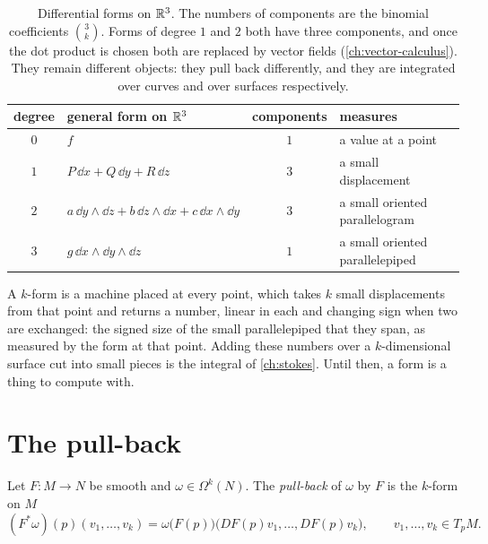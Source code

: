 \begin{notechapter}
\begin{table}[ht]
\centering
\begin{tabular}{@{}clcl@{}}
\toprule
degree & general form on $\mathbb{R}^3$ & components & measures \\
\midrule
$0$ & $f$ & $1$ & a value at a point \\
$1$ & $P\,\dd x + Q\,\dd y + R\,\dd z$ & $3$
  & a small displacement \\
$2$ & $a\,\dd y\wedge\dd z + b\,\dd z\wedge\dd x + c\,\dd x\wedge\dd y$
  & $3$ & a small oriented parallelogram \\
$3$ & $g\,\dd x\wedge\dd y\wedge\dd z$ & $1$
  & a small oriented parallelepiped \\
\bottomrule
\end{tabular}
\caption{Differential forms on $\mathbb{R}^3$. The numbers of components are the
binomial coefficients $\binom3k$. Forms of degree $1$ and $2$ both have
three components, and once the dot product is chosen both are replaced
by vector fields (\cref{ch:vector-calculus}). They remain different
objects: they pull back differently, and they are integrated over
curves and over surfaces respectively.}
\label{differential-forms:tab:degrees}
\end{table}

\begin{intuition}
A $k$-form is a machine placed at every point, which takes $k$ small
displacements from that point and returns a number, linear in each and
changing sign when two are exchanged: the signed size of the small
parallelepiped that they span, as measured by the form at that point.
Adding these numbers over a $k$-dimensional surface cut into small
pieces is the integral of \cref{ch:stokes}. Until then, a form is a
thing to compute with.
\end{intuition}

\section{The pull-back}\label{differential-forms:sec:pullback}

\begin{definition}\label{differential-forms:def:pullback}
Let $F:M\to N$ be smooth and $\omega\in\Omega^k(N)$. The
\emph{pull-back} of $\omega$ by $F$ is the $k$-form on $M$
\[
  (F^*\omega)(p)(v_1,\dots,v_k)
  = \omega\bigl(F(p)\bigr)\bigl(DF(p)v_1,\dots,DF(p)v_k\bigr) ,
  \qquad v_1,\dots,v_k\in T_pM .
\]
\end{definition}


\end{notechapter}
